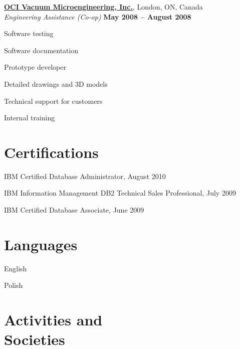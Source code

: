 \documentclass[margin,line]{resume}
\begin{document}
\begin{resume}
	\textbf{\href{http://www.ocivm.com/}{OCI Vacuum Microengineering, Inc.}}, London, ON, Canada	\vspace{2mm}\\\vspace{1mm}
	\textsl{Engineering Assistance (Co-op)}					\hfill\textbf{May 2008 -- August 2008}		\\\vspace{-3mm}
	\begin{list2}
		\item Software testing
		\item Software documentation
		\item Prototype developer
		\item Detailed drawings and 3D models
		\item Technical support for customers
		\item Internal training
	\end{list2}

\section{\mysidestyle Certifications}

\begin{list2}
	\item IBM Certified Database Administrator, August 2010
	\item IBM Information Management DB2 Technical Sales Professional, July 2009
	\item IBM Certified Database Associate, June 2009
\end{list2}

\section{\mysidestyle Languages}

\begin{list2}
	\item English
	\item Polish
\end{list2}

\section{\mysidestyle Activities and\\Societies}


\end{resume}
\end{document}
